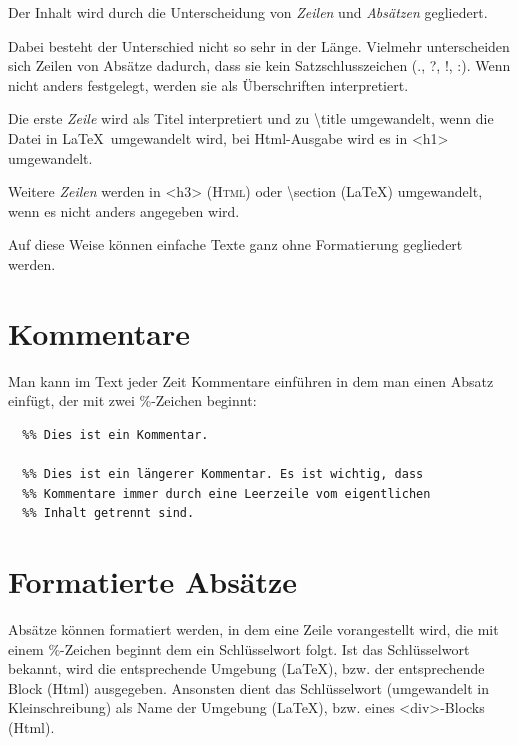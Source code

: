 \documentclass{scrartcl}
\begin{document}
{Der Inhalt wird durch die Unterscheidung von \emph{Zeilen} und
\emph{Absätzen} gegliedert.\\}

{Dabei besteht der Unterschied nicht so sehr in der
Länge. Vielmehr unterscheiden sich Zeilen von Absätze
dadurch, dass sie kein Satzschlusszeichen (., ?, !, :).
Wenn nicht anders festgelegt, werden sie als Überschriften
interpretiert.\\}

{Die erste \emph{Zeile} wird als Titel interpretiert und zu \textbackslash title
umgewandelt, wenn die Datei in \LaTeX\  umgewandelt wird, bei
Html-Ausgabe wird es in <h1> umgewandelt.\\}

{Weitere \emph{Zeilen} werden in <h3> (\textsc{Html}) oder \textbackslash section
(LaTeX) umgewandelt, wenn es nicht anders angegeben wird.\\}

{Auf diese Weise können einfache Texte ganz ohne Formatierung
gegliedert werden.\\}

\section{Kommentare}

{Man kann im Text jeder Zeit Kommentare einführen in dem man einen Absatz einfügt, der mit zwei \%-Zeichen beginnt:\\}

\begin{verbatim}
  %% Dies ist ein Kommentar.

  %% Dies ist ein längerer Kommentar. Es ist wichtig, dass
  %% Kommentare immer durch eine Leerzeile vom eigentlichen
  %% Inhalt getrennt sind.
\end{verbatim}




\section{Formatierte Absätze}

{Absätze können formatiert werden, in dem eine Zeile
vorangestellt wird, die mit einem \%-Zeichen beginnt dem ein
Schlüsselwort folgt. Ist das Schlüsselwort bekannt, wird
die entsprechende Umgebung (LaTeX), bzw. der entsprechende
Block (Html) ausgegeben. Ansonsten dient das Schlüsselwort
(umgewandelt in Kleinschreibung) als Name der Umgebung
(LaTeX), bzw. eines <div>-Blocks (Html).\\}
\end{document}
